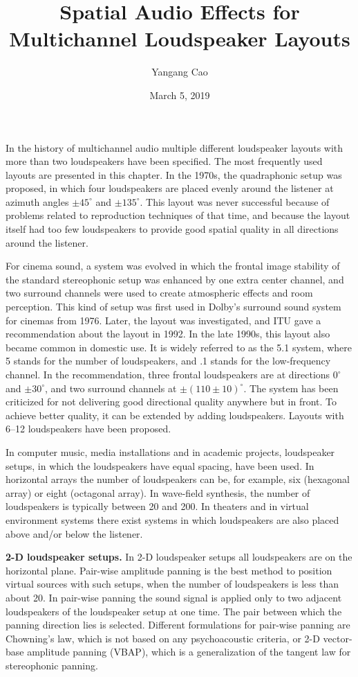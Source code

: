 \documentclass[10pt,a4paper,oneside]{article}
\author{Yangang Cao}
\date{March 5, 2019}
\begin{document}
\title{Spatial Audio Effects for Multichannel Loudspeaker Layouts}
\maketitle 
In the history of multichannel audio multiple different loudspeaker layouts with more than two loudspeakers have been specified. The most frequently used layouts are presented in this chapter. In the 1970s, the quadraphonic setup was proposed, in which four loudspeakers are placed evenly around the listener at azimuth angles $\pm45^{\circ}$ and $\pm135^{\circ}$. This layout was never successful because of problems related to reproduction techniques of that time, and because the layout itself had too few loudspeakers to provide good spatial quality in all directions around the listener.

For cinema sound, a system was evolved in which the frontal image stability of the standard stereophonic setup was enhanced by one extra center channel, and two surround channels were used to create atmospheric effects and room perception. This kind of setup was first used in Dolby’s surround sound system for cinemas from 1976. Later, the layout was investigated, and ITU gave a recommendation about the layout in 1992. In the late 1990s, this layout also became common in domestic use. It is widely referred to as the 5.1 system, where 5 stands for the number of loudspeakers, and .1 stands for the low-frequency channel. In the recommendation, three frontal loudspeakers are at directions $0^{\circ}$ and $\pm30^{\circ}$, and two surround channels at $\pm(110\pm10)^{\circ}$. The system has been criticized for not delivering good directional quality anywhere but in front. To achieve better quality, it can be extended by adding loudspeakers. Layouts with 6–12 loudspeakers have been proposed.


In computer music, media installations and in academic projects, loudspeaker setups, in which the loudspeakers have equal spacing, have been used. In horizontal arrays the number of loudspeakers can be, for example, six (hexagonal array) or eight (octagonal array). In wave-field synthesis, the number of loudspeakers is typically between 20 and 200. In theaters and in virtual environment systems there exist systems in which loudspeakers are also placed above and/or below the listener.

{\bfseries 2-D loudspeaker setups.} 
In 2-D loudspeaker setups all loudspeakers are on the horizontal plane. Pair-wise amplitude panning is the best method to position virtual sources with such setups, when the number of loudspeakers is less than about 20. In pair-wise panning the sound signal is applied only to two adjacent loudspeakers of the loudspeaker setup at one time. The pair between which the panning direction lies is selected. Different formulations for pair-wise panning are Chowning’s law, which is not based on any psychoacoustic criteria, or 2-D vector-base amplitude panning (VBAP), which is a generalization of the tangent law for stereophonic panning.
\end{document}
